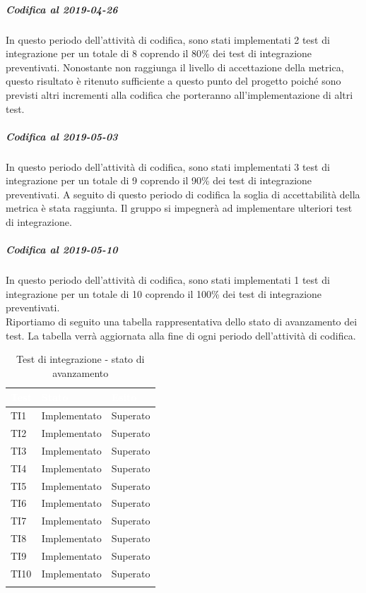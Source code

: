\subparagraph{Codifica al 2019-04-26}
In questo periodo dell'attività di codifica, sono stati implementati 2 test di integrazione per un totale di 8 coprendo il 80\% dei test di integrazione preventivati.
Nonostante non raggiunga il livello di accettazione della
metrica, questo risultato è ritenuto sufficiente a questo punto del progetto poiché sono previsti altri incrementi alla codifica che porteranno all'implementazione di altri test. 

\subparagraph{Codifica al 2019-05-03}
In questo periodo dell'attività di codifica, sono stati implementati 3 test di integrazione per un totale di 9 coprendo il 90\% dei test di integrazione preventivati.
A seguito di questo periodo di codifica la soglia di accettabilità della metrica è stata raggiunta.
Il gruppo si impegnerà ad implementare ulteriori test di integrazione.


\subparagraph{Codifica al 2019-05-10}
In questo periodo dell'attività di codifica, sono stati implementati 1 test di integrazione per un totale di 10 coprendo il 100\% dei test di integrazione preventivati.
\\
Riportiamo di seguito una tabella rappresentativa dello stato di avanzamento dei test. La tabella verrà aggiornata alla fine di ogni periodo dell'attività di codifica.

	\begin{longtable}{|>{\centering\arraybackslash}m{1.6cm}|>{\centering\arraybackslash}m{6.41cm}|>{\centering\arraybackslash}m{3.1cm}|}		
	\rowcolor{LightBlue}
	\textbf{\textcolor{white}{Test}}
	& \textbf{\textcolor{white}{Stato}}
	& \textbf{\textcolor{white}{Esito}}\\
	\hline
	TI1
	& Implementato & Superato
	\\ \hline
	\rowcolor{LightGray}
	TI2
	& Implementato & Superato
	\\ \hline
	TI3
	& Implementato & Superato
	\\ \hline
	\rowcolor{LightGray}
	TI4
	& Implementato & Superato
	\\ \hline
	TI5
	& Implementato & Superato
	\\ \hline
	\rowcolor{LightGray}
	TI6
	& Implementato & Superato
	\\ \hline	
	TI7
	& Implementato & Superato
	\\ \hline	
	\rowcolor{LightGray}
	TI8
	& Implementato & Superato
	\\ \hline	
	TI9
	& Implementato & Superato
	\\ \hline	
	\rowcolor{LightGray}
	TI10
	& Implementato & Superato
	\\ \hline	
	\caption{Test di integrazione - stato di avanzamento}
\end{longtable}


